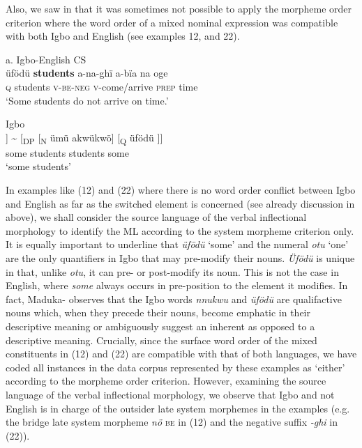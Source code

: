 \documentclass[output=paper]{langsci/langscibook}
\begin{document}
Also, we saw in  that it was sometimes not possible to apply the morpheme order criterion where the word order of a mixed nominal expression was compatible with both Igbo and English (see examples 12, and 22).

\ea
{a. Igbo-English CS}\\
\gll üfödü  \textbf{students}\textbf{  }a-na-ghï   a-bïa    na   oge\\
     \textsc{q}     students  \textsc{v-be-neg}  \textsc{v}{}-come/arrive  \textsc{prep}  time   \\
\glt ‘Some students do not arrive on time.’
\z

\ea
{Igbo }\\
\gll [\textsubscript{DP}\textsuperscript{ }[\textsubscript{Q }üfödü]  [\textsubscript{N }ümü akwükwö]] {\textasciitilde} [\textsubscript{DP }[\textsubscript{N  }ümü akwükwö]  [\textsubscript{Q }üfödü\textsubscript{ }]]\\
           some      students              students        some\\
\glt ‘some students’
\z

In examples like (12) and (22) where there is no word order conflict between Igbo and English as far as the switched element is concerned (see already discussion in  above), we shall consider the source language of the verbal inflectional morphology to identify the ML according to the system morpheme criterion only. It is equally important to underline that \textit{üfödü} ‘some’ and the numeral \textit{otu} ‘one’ are the only quantifiers in Igbo that may pre-modify their nouns. \textit{Üfödü} is unique in that, unlike \textit{otu}, it can pre- or post-modify its noun. This is not the case in English, where \textit{some} always occurs in pre-position to the element it modifies. In fact, Maduka-\citet[239]{Durunze1990} observes that the Igbo words \textit{nnukwu} and \textit{üfödü} are qualifactive nouns which, when they precede their nouns, become emphatic in their descriptive meaning or ambiguously suggest an inherent as opposed to a descriptive meaning. Crucially, since the surface word order of the mixed constituents in (12) and (22) are compatible with that of both languages, we have coded all instances in the data corpus represented by these examples as ‘either’ according to the morpheme order criterion. However, examining the source language of the verbal inflectional morphology, we observe that Igbo and not English is in charge of the outsider late system morphemes in the examples (e.g. the bridge late system morpheme \textit{nö }\textsc{be} in (12) and the negative suffix \textit{{}-ghi }in (22)). 
\end{document}
